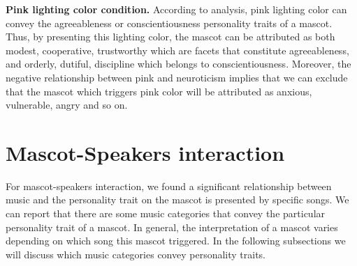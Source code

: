 \par \textbf{Pink lighting color condition.} According to analysis, pink lighting color can convey the agreeableness or conscientiousness personality traits of a mascot. Thus, by presenting this lighting color, the mascot can be attributed as both modest, cooperative, trustworthy which are facets that constitute agreeableness, and orderly, dutiful, discipline which belongs to conscientiousness. Moreover, the negative relationship between pink and neuroticism implies that we can exclude that the mascot which triggers pink color will be attributed as anxious, vulnerable, angry and so on.

\section{Mascot-Speakers interaction}
For mascot-speakers interaction, we found a significant relationship between music and the personality trait on the mascot is presented by specific songs. We can report that there are some music categories that convey the particular personality trait of a mascot. In general, the interpretation of a mascot varies depending on which song this mascot triggered. In the following subsections we will discuss which music categories convey personality traits.
